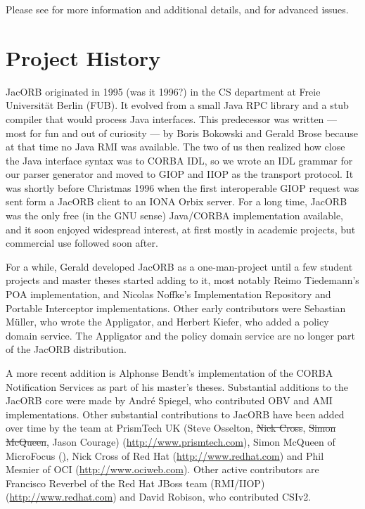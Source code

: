 Please see \cite{Brose2001a,Siegel2000, Vinoski1997} for more
information and additional details, and \cite{Henning1999} for
advanced issues.

\section{Project History}

JacORB originated in 1995 (was it 1996?) in the CS department at Freie
Universit{\"a}t Berlin (FUB). It evolved from a small Java RPC library and a
stub compiler that would process Java interfaces. This predecessor was
written --- most for fun and out of curiosity --- by Boris Bokowski
and Gerald Brose because at that time no Java RMI was available. The
two of us then realized how close the Java interface syntax was to
CORBA IDL, so we wrote an IDL grammar for our parser generator and
moved to GIOP and IIOP as the transport protocol. It was shortly
before Christmas 1996 when the first interoperable GIOP request was
sent form a JacORB client to an IONA Orbix server. For a long time,
JacORB was the only free (in the GNU sense) Java/CORBA implementation
available, and it soon enjoyed widespread interest, at first mostly in
academic projects, but commercial use followed soon after.

For a while, Gerald developed JacORB as a one-man-project until a few
student projects and master theses started adding to it, most notably
Reimo Tiedemann's POA implementation, and Nicolas Noffke's
Implementation Repository and Portable Interceptor implementations.
Other early contributors were Sebastian M{\"u}ller, who wrote the
Appligator, and Herbert Kiefer, who added a policy domain service. The
Appligator and the policy domain service are no longer part of the
JacORB distribution.

A more recent addition is Alphonse Bendt's implementation of the CORBA
Notification Services as part of his master's theses. Substantial additions to
the JacORB core were made by Andr{\'e} Spiegel, who contributed OBV and AMI
implementations. Other substantial contributions to JacORB have been added over
time by the team at PrismTech UK (Steve Osselton, \sout{Nick Cross}, \sout{Simon
McQueen}, Jason Courage)
(\href{http://www.prismtech.com}{http://www.prismtech.com}), Simon McQueen of
MicroFocus (\href{http://www.microfocus.com/products/corba/openfusion/jacorb/index.aspx}),
Nick Cross of Red Hat (\href{http://www.redhat.com}{http://www.redhat.com}) and Phil Mesnier of
OCI (\href{http://www.ociweb.com}{http://www.ociweb.com}). Other active
contributors are Francisco Reverbel of the Red Hat JBoss team (RMI/IIOP)
(\href{http://www.redhat.com}{http://www.redhat.com}) and David Robison, who
contributed CSIv2.

